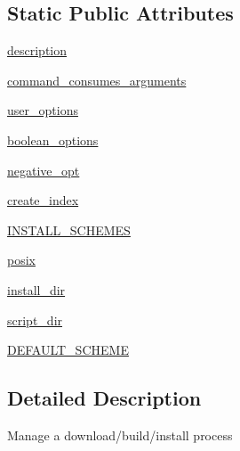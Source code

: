 \subsection*{Static Public Attributes}
\begin{DoxyCompactItemize}
\item 
\hyperlink{classsetuptools_1_1command_1_1easy__install_1_1easy__install_a4223e7f0c7979440a2553138ba174a5b}{description}
\item 
\hyperlink{classsetuptools_1_1command_1_1easy__install_1_1easy__install_ad2ac2ab809a764f2ec27fdba336b0ce4}{command\+\_\+consumes\+\_\+arguments}
\item 
\hyperlink{classsetuptools_1_1command_1_1easy__install_1_1easy__install_a5f68e5debfb202a92f2349b9eff62a6c}{user\+\_\+options}
\item 
\hyperlink{classsetuptools_1_1command_1_1easy__install_1_1easy__install_ab60b75b367d1c453585ea63cf19abf01}{boolean\+\_\+options}
\item 
\hyperlink{classsetuptools_1_1command_1_1easy__install_1_1easy__install_a899b0be0fd0ffc59bddbcece110082f2}{negative\+\_\+opt}
\item 
\hyperlink{classsetuptools_1_1command_1_1easy__install_1_1easy__install_a0fa9610fc4bff94a9847b570edc6b825}{create\+\_\+index}
\item 
\hyperlink{classsetuptools_1_1command_1_1easy__install_1_1easy__install_a61688ced2ba513587927ddedcc08eddc}{I\+N\+S\+T\+A\+L\+L\+\_\+\+S\+C\+H\+E\+M\+ES}
\item 
\hyperlink{classsetuptools_1_1command_1_1easy__install_1_1easy__install_a30db8e38ac7929a87a818902ea01a432}{posix}
\item 
\hyperlink{classsetuptools_1_1command_1_1easy__install_1_1easy__install_a1b80f13e00ade511bf1823bddce3341a}{install\+\_\+dir}
\item 
\hyperlink{classsetuptools_1_1command_1_1easy__install_1_1easy__install_acf30ffa16f1af2199c6342c4c7eae53c}{script\+\_\+dir}
\item 
\hyperlink{classsetuptools_1_1command_1_1easy__install_1_1easy__install_aba43a198d3a4f7404585c479e30f9293}{D\+E\+F\+A\+U\+L\+T\+\_\+\+S\+C\+H\+E\+ME}
\end{DoxyCompactItemize}


\subsection{Detailed Description}
\begin{DoxyVerb}Manage a download/build/install process\end{DoxyVerb}
 

